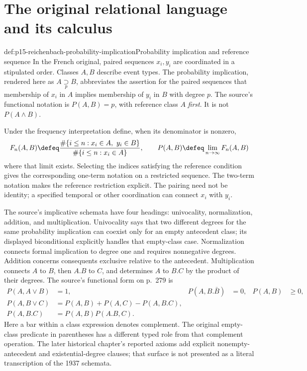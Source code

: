 \section{The original relational language and its calculus}
\label{sec:p15-reichenbach-relational-calculus}

\begin{hbdefinition}{def:p15-reichenbach-probability-implication}{Probability implication and reference sequence}
In the French original, paired sequences \(x_i,y_i\) are coordinated
in a stipulated order. Classes \(A,B\) describe event types. The
probability implication, rendered here as
\(A\mathrel{\underset{p}{\supset}}B\), abbreviates the assertion
for the paired sequences that membership of \(x_i\) in \(A\)
implies membership of \(y_i\) in \(B\) with degree \(p\).
The source's functional notation is \(P(A,B)=p\), with reference
class \(A\) \emph{first}. It is not \(P(A\land B)\).

Under the frequency interpretation define, when its denominator is
nonzero,
\[
 F_n(A,B)\defeq
 \frac{\#\{i\leq n:x_i\in A,\ y_i\in B\}}
      {\#\{i\leq n:x_i\in A\}},\qquad
 P(A,B)\defeq\lim_{n\to\infty}F_n(A,B)
\]
where that limit exists. Selecting the indices satisfying the reference
condition gives the corresponding one-term notation on a restricted
sequence. The two-term notation makes the reference restriction
explicit. The pairing need not be identity; a specified temporal
or other coordination can connect \(x_i\) with \(y_i\).
\end{hbdefinition}

The source's implicative schemata have four headings: univocality,
normalization, addition, and multiplication. Univocality says that two
different degrees for the same probability implication can coexist only
for an empty antecedent class; its displayed biconditional explicitly
handles that empty-class case. Normalization connects formal implication
to degree one and requires nonnegative degrees. Addition concerns
consequents exclusive relative to the antecedent. Multiplication connects
\(A\) to \(B\), then \(A.B\) to \(C\), and determines
\(A\) to \(B.C\) by the product of their degrees. The source's
functional form on p.~279 is
\[
\begin{aligned}
 P(A,A\lor B)&=1,& P(A,B.\bar B)&=0,&P(A,B)&\geq0,\\
 P(A,B\lor C)&=P(A,B)+P(A,C)-P(A,B.C),\\
 P(A,B.C)&=P(A,B)P(A.B,C).
\end{aligned}
\]
Here a bar within a class expression denotes complement. The original
empty-class predicate in parentheses has a different typed role from
that complement operation. The later historical chapter's reported
axioms add explicit nonempty-antecedent and existential-degree clauses;
that surface is not presented as a literal transcription of the 1937
schemata.

